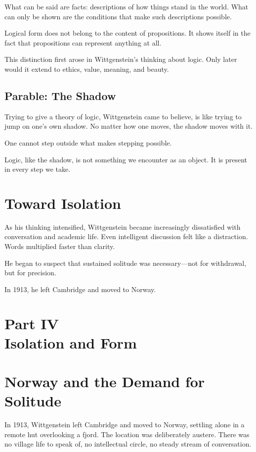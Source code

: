\documentclass[11pt]{article}
\begin{document}
What can be said are facts: descriptions of how things stand in the world.  
What can only be shown are the conditions that make such descriptions possible.

Logical form does not belong to the content of propositions. It shows itself in the fact that propositions can represent anything at all.

This distinction first arose in Wittgenstein’s thinking about logic. Only later would it extend to ethics, value, meaning, and beauty.

\subsection*{Parable: The Shadow}

Trying to give a theory of logic, Wittgenstein came to believe, is like trying to jump on one’s own shadow. No matter how one moves, the shadow moves with it.

One cannot step outside what makes stepping possible.

Logic, like the shadow, is not something we encounter as an object. It is present in every step we take.

\section*{Toward Isolation}

As his thinking intensified, Wittgenstein became increasingly dissatisfied with conversation and academic life. Even intelligent discussion felt like a distraction. Words multiplied faster than clarity.

He began to suspect that sustained solitude was necessary—not for withdrawal, but for precision.

In 1913, he left Cambridge and moved to Norway.

\newpage
\section*{Part IV \\ Isolation and Form}

\section*{Norway and the Demand for Solitude}

In 1913, Wittgenstein left Cambridge and moved to Norway, settling alone in a remote hut overlooking a fjord. The location was deliberately austere. There was no village life to speak of, no intellectual circle, no steady stream of conversation.
\end{document}
